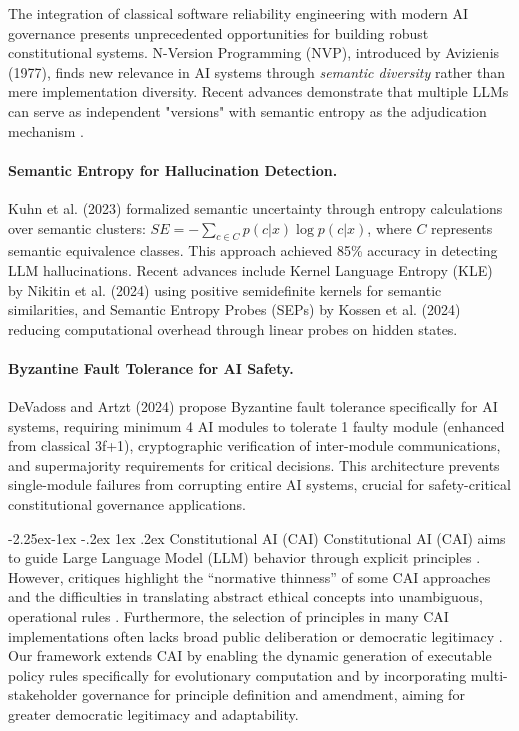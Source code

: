 \documentclass[manuscript,screen,9pt]{acmart}
\makeatletter
\renewcommand\subsection{\@startsection{subsection}{2}{\z@}%
  {-2.25ex\@plus -1ex \@minus -.2ex}%
  {1ex \@plus .2ex}%
  {\normalfont\large\bfseries}}
\makeatother
\begin{document}
\begin{table}[!htb]
The integration of classical software reliability engineering with modern AI governance presents unprecedented opportunities for building robust constitutional systems. N-Version Programming (NVP), introduced by Avizienis (1977), finds new relevance in AI systems through \textit{semantic diversity} rather than mere implementation diversity. Recent advances demonstrate that multiple LLMs can serve as independent "versions" with semantic entropy as the adjudication mechanism \cite{Kuhn2023SemanticEntropy}.

\paragraph{Semantic Entropy for Hallucination Detection.} Kuhn et al. (2023) formalized semantic uncertainty through entropy calculations over semantic clusters: $SE = -\sum_{c \in C} p(c|x) \log p(c|x)$, where $C$ represents semantic equivalence classes. This approach achieved 85\% accuracy in detecting LLM hallucinations. Recent advances include Kernel Language Entropy (KLE) by Nikitin et al. (2024) using positive semidefinite kernels for semantic similarities, and Semantic Entropy Probes (SEPs) by Kossen et al. (2024) reducing computational overhead through linear probes on hidden states.

\paragraph{Byzantine Fault Tolerance for AI Safety.} DeVadoss and Artzt (2024) propose Byzantine fault tolerance specifically for AI systems, requiring minimum 4 AI modules to tolerate 1 faulty module (enhanced from classical 3f+1), cryptographic verification of inter-module communications, and supermajority requirements for critical decisions. This architecture prevents single-module failures from corrupting entire AI systems, crucial for safety-critical constitutional governance applications.

\subsection{Constitutional AI (CAI)}
Constitutional AI (CAI) aims to guide Large Language Model (LLM) behavior through explicit principles \cite{Bai2025ConstitutionalAI}. However, critiques highlight the ``normative thinness'' of some CAI approaches and the difficulties in translating abstract ethical concepts into unambiguous, operational rules \cite{DigiCon2025ConstitutionalAIThin, ChaconMenke2025CAISmallLLMs}. Furthermore, the selection of principles in many CAI implementations often lacks broad public deliberation or democratic legitimacy \cite{Hwang2025PublicCAI}. Our framework extends CAI by enabling the dynamic generation of executable policy rules specifically for evolutionary computation and by incorporating multi-stakeholder governance for principle definition and amendment, aiming for greater democratic legitimacy and adaptability.


\end{table}
\end{document}
